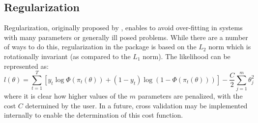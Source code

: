 \subsection{Regularization}
Regularization, originally proposed by \cite{Tikhonov1974}, enables to avoid over-fitting in systems with many parameters or generally ill posed problems. While there are a number of ways to do this, regularization in the \@verb@dbm package is based on the $L_2$ norm which is rotationally invariant (as compared to the $L_1$ norm). The likelihood can be represented as:
\begin{equation}
l\left( \theta  \right) = \sum\limits_{t = 1}^T {\left[ {{y_t}\log \Phi \left( {{\pi _t}\left( \theta  \right)} \right) + \left( {1 - {y_t}} \right)\log \left( {1 - \Phi \left( {{\pi _t}\left( \theta  \right)} \right)} \right)} \right]}  - \frac{C}{2}\sum\limits_{j = 1}^m {\theta _j^2}
\end{equation}
where it is clear how higher values of the $m$ parameters are penalized, with the cost $C$ determined by the user. In a future, cross validation may be implemented internally to enable the determination of this cost function.
